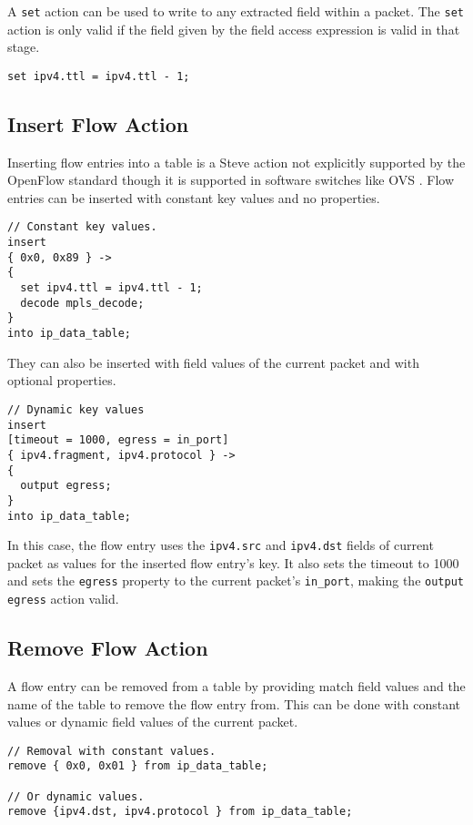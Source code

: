 A \texttt{set} action can be used to write to any extracted field within a packet. The \texttt{set} action is only valid if the field given by the field access expression is valid in that stage.

\begin{lstlisting}
set ipv4.ttl = ipv4.ttl - 1;
\end{lstlisting}

\subsection{Insert Flow Action} \label{insert_flow_action_tut}

Inserting flow entries into a table is a Steve action not explicitly supported by the OpenFlow standard \cite{openflow_spec} though it is supported in software switches like OVS \cite{ovs_man_page}. Flow entries can be inserted with constant key values and no properties. 

\begin{lstlisting}
// Constant key values.
insert
{ 0x0, 0x89 } ->
{
  set ipv4.ttl = ipv4.ttl - 1;
  decode mpls_decode;
} 
into ip_data_table;
\end{lstlisting}

They can also be inserted with field values of the current packet and with optional properties.

\begin{lstlisting}
// Dynamic key values
insert
[timeout = 1000, egress = in_port]
{ ipv4.fragment, ipv4.protocol } ->
{
  output egress;
} 
into ip_data_table;
\end{lstlisting}

In this case, the flow entry uses the \texttt{ipv4.src} and \texttt{ipv4.dst} fields of current packet as values for the inserted flow entry's key. It also sets the timeout to 1000 and sets the \texttt{egress} property to the current packet's \texttt{in\_port}, making the \texttt{output egress} action valid.

\subsection{Remove Flow Action} \label{remove_flow_action_tut}

A flow entry can be removed from a table by providing match field values and the name of the table to remove the flow entry from. This can be done with constant values or dynamic field values of the current packet.

\begin{lstlisting}
// Removal with constant values.
remove { 0x0, 0x01 } from ip_data_table;

// Or dynamic values.
remove {ipv4.dst, ipv4.protocol } from ip_data_table;
\end{lstlisting}

